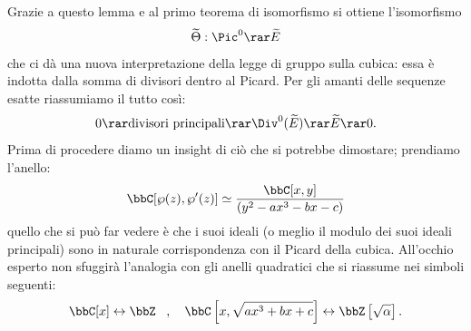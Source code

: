 Grazie a questo lemma e al primo teorema di isomorfismo si ottiene l'isomorfismo
$$
\widetilde{\Theta}: \Pic^0 \rar \widetilde{E}
$$
che ci dà una nuova interpretazione della legge di gruppo sulla cubica: essa è indotta dalla somma di divisori dentro al Picard. Per gli amanti delle sequenze esatte riassumiamo il tutto così:
$$
0\rar\mbox{divisori principali}\rar \Div^0(\widetilde{E})\rar \widetilde{E}\rar 0.
$$
Prima di procedere diamo un insight di ciò che si potrebbe dimostare; prendiamo l'anello:
$$
\bbC[\wp(z),\wp'(z)]\simeq\frac{\bbC[x,y]}{(y^2 - ax^3 - bx - c)}
$$
quello che si può far vedere è che i suoi ideali (o meglio il modulo dei suoi ideali principali) sono in naturale corrispondenza con il Picard della cubica. All'occhio esperto non sfuggirà l'analogia con gli anelli quadratici che si riassume nei simboli seguenti:
$$
\bbC[x] \leftrightarrow \bbZ\, \ \ , \ \ \ \bbC\left[x,\sqrt{ax^3+bx+c}\right] \leftrightarrow \bbZ\left[\sqrt{\alpha}\right].
$$ 
